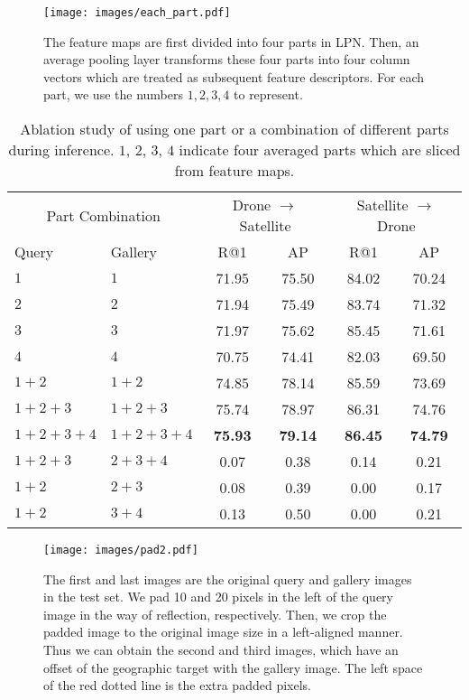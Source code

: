\documentclass[journal]{IEEEtran}
\begin{document}
\begin{figure}[t]
  \centering
  \texttt{[image: images/each\_part.pdf]}
  \caption{The feature maps are first divided into four parts in LPN. Then, an average pooling layer transforms these four parts into four column vectors which are treated as subsequent feature descriptors. For each part, we use the numbers $1, 2, 3, 4$ to represent. }
  \label{fig:each_part}
\end{figure}

\setlength{\tabcolsep}{1pt}
\begin{table}[t]
\small
\caption{Ablation study of using one part or a combination of different parts during inference. $1$, $2$, $3$, $4$ indicate four averaged parts which are sliced from feature maps.
}
\begin{center}
\begin{tabular}{ll|cc|cc}
\hline
\multicolumn{2}{c|}{Part Combination}& \multicolumn{2}{c|}{Drone $\rightarrow$ Satellite} & \multicolumn{2}{c}{Satellite $\rightarrow$ Drone}\\
 Query & Gallery & R@1 & AP & R@1 & AP\\
\shline
$1$ & $1$ & 71.95 & 75.50 & 84.02 & 70.24 \\
$2$ & $2$ & 71.94 & 75.49 & 83.74 & 71.32 \\
$3$ & $3$ & 71.97 & 75.62 & 85.45 & 71.61 \\
$4$ & $4$ & 70.75 & 74.41 & 82.03 & 69.50 \\
$1+2$ & $1+2$ & 74.85 & 78.14 & 85.59 & 73.69 \\
$1+2+3$ & $1+2+3$ & 75.74 & 78.97 & 86.31 & 74.76 \\
$1+2+3+4$ & $1+2+3+4$ & \textbf{75.93} & \textbf{79.14} & \textbf{86.45} & \textbf{74.79} \\
$1+2+3$ & $2+3+4$ & 0.07 & 0.38 & 0.14 & 0.21 \\
$1+2$ & $2+3$ & 0.08 & 0.39 & 0.00 & 0.17 \\
$1+2$ & $3+4$ & 0.13 & 0.50 & 0.00 & 0.21 \\
\hline
\end{tabular}
\end{center}
\label{table:part_influence}
\end{table}

\begin{figure}[t]
  \centering
  \texttt{[image: images/pad2.pdf]}
  \caption{The first and last images are the original query and gallery images in the test set. We pad 10 and 20 pixels in the left of the query image in the way of reflection, respectively. Then, we crop the padded image to the original image size in a left-aligned manner. Thus we can obtain the second and third images, which have an offset of the geographic target with the gallery image. The left space of the red dotted line is the extra padded pixels.}
  \label{fig:pad}
\end{figure}
\end{document}
